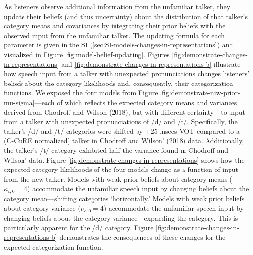 \documentclass[
  11pt,
  english,
  man,floatsintext]{apa6}
\begin{document}
As listeners observe additional information from the unfamiliar talker, they update their beliefs (and thus uncertainty) about the distribution of that talker's category means and covariances by integrating their prior beliefs with the observed input from the unfamiliar talker. The updating formula for each parameter is given in the SI (\ref{sec:SI-models-changes-in-representations}) and visualized in Figure \ref{fig:model-belief-updating}. Figures \ref{fig:demonstrate-changes-in-representations} and \ref{fig:demonstrate-changes-in-representations-b} illustrate how speech input from a talker with unexpected pronunciations changes listeners' beliefs about the category likelihoods and, consequently, their categorization functions. We exposed the four models from Figure \ref{fig:demonstrate-niw-prior-mu-sigma}---each of which reflects the expected category means and variances derived from Chodroff and Wilson (2018), but with different certainty---to input from a talker with unexpected pronunciations of /d/ and /t/. Specifically, the talker's /d/ and /t/ categories were shifted by +25 msecs VOT compared to a (C-CuRE normalized) talker in Chodroff and Wilson' (2018) data. Additionally, the talker's /t/-category exhibited half the variance found in Chodroff and Wilson' data. Figure \ref{fig:demonstrate-changes-in-representations} shows how the expected category likelihoods of the four models change as a function of input from the new talker. Models with weak prior beliefs about category means (\(\kappa_{c,0}=4\)) accommodate the unfamiliar speech input by changing beliefs about the category mean---shifting categories `horizontally.' Models with weak prior beliefs about category variance (\(\nu_{c,0}=4\)) accommodate the unfamiliar speech input by changing beliefs about the category variance---expanding the category. This is particularly apparent for the /d/ category. Figure \ref{fig:demonstrate-changes-in-representations-b} demonstrates the consequences of these changes for the expected categorization function.
\end{document}
